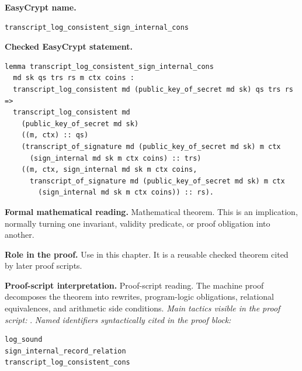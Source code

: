 \begin{formaltheorem}
\noindent\textbf{EasyCrypt name.}
\begin{lstlisting}[language=EasyCrypt,basicstyle=\ttfamily\scriptsize]
transcript_log_consistent_sign_internal_cons
\end{lstlisting}
\noindent\textbf{Checked EasyCrypt statement.}
\begin{lstlisting}[language=EasyCrypt,basicstyle=\ttfamily\scriptsize]
lemma transcript_log_consistent_sign_internal_cons
  md sk qs trs rs m ctx coins :
  transcript_log_consistent md (public_key_of_secret md sk) qs trs rs =>
  transcript_log_consistent md
    (public_key_of_secret md sk)
    ((m, ctx) :: qs)
    (transcript_of_signature md (public_key_of_secret md sk) m ctx
      (sign_internal md sk m ctx coins) :: trs)
    ((m, ctx, sign_internal md sk m ctx coins,
      transcript_of_signature md (public_key_of_secret md sk) m ctx
        (sign_internal md sk m ctx coins)) :: rs).
\end{lstlisting}
\noindent\textbf{Formal mathematical reading.}
Mathematical theorem. This is an implication, normally turning one invariant, validity predicate, or proof obligation into another.

\noindent\textbf{Role in the proof.}
Use in this chapter. It is a reusable checked theorem cited by later proof scripts.

\noindent\textbf{Proof-script interpretation.}
Proof-script reading. The machine proof decomposes the theorem into rewrites, program-logic obligations, relational equivalences, and arithmetic side conditions.
\emph{Main tactics visible in the proof script:} .
\emph{Named identifiers syntactically cited in the proof block:}
\begin{lstlisting}[language=EasyCrypt,basicstyle=\ttfamily\scriptsize]
log_sound
sign_internal_record_relation
transcript_log_consistent_cons
\end{lstlisting}

\end{formaltheorem}


